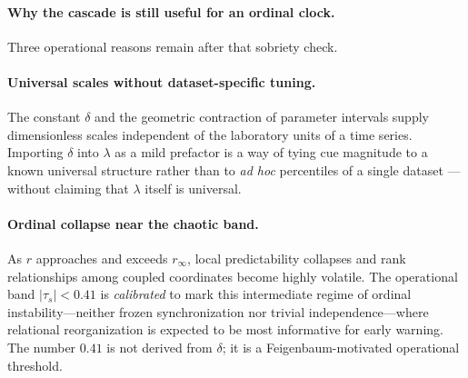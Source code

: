 \documentclass[11pt,a4paper]{article}
\begin{document}
\paragraph{Why the cascade is still useful for an ordinal clock.}
Three operational reasons remain after that sobriety check.

\paragraph{Universal scales without dataset-specific tuning.}
The constant $\delta$ and the geometric contraction of parameter
intervals supply dimensionless scales independent of the laboratory units
of a time series. Importing $\delta$ into $\lambda$ as a mild prefactor
is a way of tying cue magnitude to a known universal structure rather
than to \emph{ad hoc} percentiles of a single dataset
\cite{Padilla2026synthesis}---without claiming that $\lambda$ itself is
universal.

\paragraph{Ordinal collapse near the chaotic band.}
As $r$ approaches and exceeds $r_\infty$, local predictability collapses
and rank relationships among coupled coordinates become highly volatile.
The operational band $|\tau_s|<0.41$ is \emph{calibrated} to mark this
intermediate regime of ordinal instability---neither frozen
synchronization nor trivial independence---where relational
reorganization is expected to be most informative for early warning. The
number $0.41$ is not derived from $\delta$; it is a Feigenbaum-motivated
operational threshold.
\end{document}
